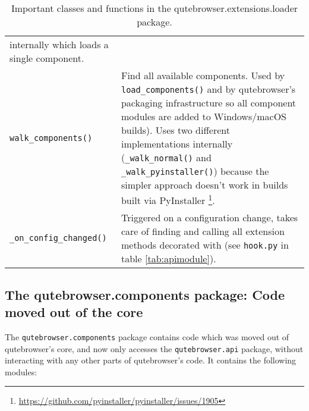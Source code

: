 \begin{table}[p]
\begin{tabulary}{\linewidth}{lL}
                               internally which loads a single component. \\
    \verb|walk_components()| & Find all available components. Used by
                               \verb|load_components()| and by qutebrowser's
                               packaging infrastructure so all component modules
                               are added to Windows/macOS builds). Uses two
                               different implementations internally (\verb|_walk_normal()| and
                               \verb|_walk_pyinstaller()|) because the simpler
                               approach doesn't work in builds built via PyInstaller
                               \footnote{\url{https://github.com/pyinstaller/pyinstaller/issues/1905}}. \\
    \verb|_on_config_changed()| & Triggered on a configuration change, takes
                                  care of finding and calling all extension
                                  methods decorated with
                                   (see
                                  \verb|hook.py| in table \ref{tab:apimodule}). \\
    \bottomrule
  \end{tabulary}
  \caption{Important classes and functions in the qutebrowser.extensions.loader
  package.}
  \label{tab:loadermod}
\end{table}

\subsection[The qutebrowser.components package]{The qutebrowser.components
  package: Code moved out of the core}
\label{sec:components}

The \verb|qutebrowser.components| package contains code which was moved out of
qutebrowser's core, and now only accesses the \verb|qutebrowser.api| package,
without interacting with any other parts of qutebrowser's code. It contains the
following modules:

